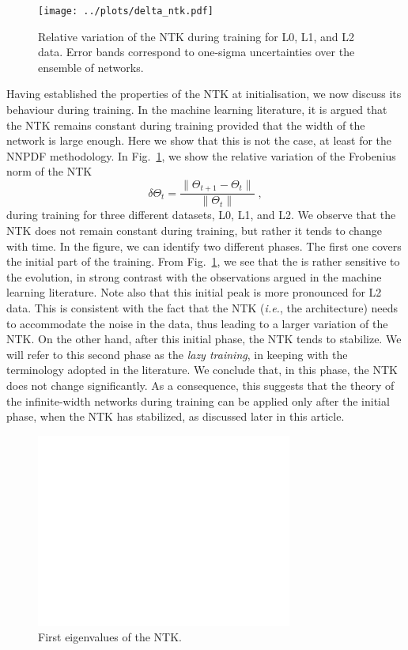 \begin{figure}[h!]
  \centering
  \texttt{[image: ../plots/delta\_ntk.pdf]}
  \caption{Relative variation of the NTK during training for L0, L1, and L2
  data. Error bands correspond to one-sigma uncertainties over the ensemble of
  networks.}
  \label{fig:NTKTime}
\end{figure}
Having established the properties of the NTK at initialisation, we now discuss
its behaviour during training. In the machine learning literature, it is argued
that the NTK remains constant during training provided that the width of the
network is large enough. Here we show that this is not the case, at least for
the NNPDF methodology. In Fig.~\ref{fig:NTKTime}, we show the relative variation
of the Frobenius norm of the NTK
\begin{equation}
\delta \Theta_t = \frac{\lVert \Theta_{t+1} - \Theta_t \rVert}{\lVert \Theta_t \rVert} \;,
\label{eq:DeltaNTK}
\end{equation}
during training for three different datasets, L0, L1, and L2. We observe that
the NTK does not remain constant during training, but rather it tends to change
with time. In the figure, we can identify two different phases. The first one
covers the initial part of the training. From Fig.~\ref{fig:NTKTime}, we see
that the is rather sensitive to the evolution, in strong contrast with the
observations argued in the machine learning literature. Note also that this
initial peak is more pronounced for L2 data. This is consistent with the fact
that the NTK (\textit{i.e.}, the architecture) needs to accommodate the noise in
the data, thus leading to a larger variation of the NTK. On the other hand,
after this initial phase, the NTK tends to stabilize. We will refer to this
second phase as the \textit{lazy training}, in keeping with the terminology
adopted in the literature. We conclude that, in this phase, the NTK does not
change significantly. As a consequence, this suggests that the theory of the
infinite-width networks during training can be applied only after the initial
phase, when the NTK has stabilized, as discussed later in this article.

\begin{figure}
  \centering
  \includegraphics[width=0.75\textwidth]{plots/eigval_L0.pdf}
  \caption{First eigenvalues of the NTK.}
  \label{fig:NTKFirstEigval}
\end{figure}

